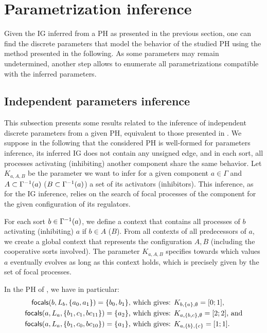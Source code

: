 \section{Parametrization inference}\label{sec:infer-K}

Given the IG inferred from a PH as presented in the previous section, one can find the discrete parameters that model the behavior of the studied PH using the method presented in the following.
As some parameters may remain undetermined, another step allows to enumerate all parametrizations compatible with the inferred parameters.

\subsection{Independent parameters inference}

This subsection presents some results related to the inference of independent discrete parameters from a given PH,
equivalent to those presented in \cite{PMR10-TCSB}.
We suppose in the following that the considered PH is well-formed for parameters inference, \ie its inferred IG does not contain any unsigned edge,
and in each sort, all processes activating (\resp inhibiting) another component share the same behavior.
Let $K_{a,A,B}$ be the parameter we want to infer for a given component $a \in \Gamma$
and $A \subset \Gamma^{-1}(a)$ (\resp $B \subset \Gamma^{-1}(a)$) a set of its activators (\resp inhibitors).
This inference, as for the IG inference, relies on the search of focal processes of the component for the given configuration of its regulators.

For each sort $b \in \Gamma^{-1}(a)$, we define a context that contains all processes of $b$ activating (\resp inhibiting) $a$ if $b \in A$ (\resp $B$).
From all contexts of all predecessors of $a$, we create a global context that represents the configuration $A,B$ (including the cooperative sorts involved).
The parameter $K_{a,A,B}$ specifies towards which values $a$ eventually evolves as long as this context holds, which is precisely given by the set of focal processes.

\begin{example*}
In the PH of , we have in particular:
\begin{align*}
\mathsf{focals}(b,L_b,\{a_0, a_1\}) = \{b_0, b_1\} &\text{, which gives: } K_{b,\{a\},\emptyset} = [0 ; 1], \\
\mathsf{focals}(a,L_a,\{b_1, c_1, bc_{11}\}) = \{a_2\} &\text{, which gives: } K_{a,\{b,c\},\emptyset} = [2 ; 2] \text{, and} \\
\mathsf{focals}(a,L_a,\{b_1, c_0, bc_{10}\}) = \{a_1\} &\text{, which gives: } K_{a,\{b\},\{c\}} = [1;1].
\end{align*}
\end{example*}

